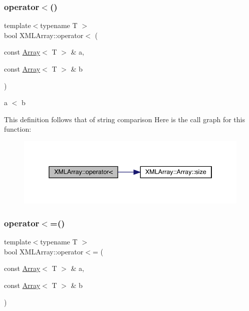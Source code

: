 \subsubsection{\texorpdfstring{operator$<$()}{operator<()}}
{\footnotesize\ttfamily template$<$typename T $>$ \\
bool X\+M\+L\+Array\+::operator$<$ (\begin{DoxyParamCaption}\item[{const \mbox{\hyperlink{classXMLArray_1_1Array}{Array}}$<$ T $>$ \&}]{a,  }\item[{const \mbox{\hyperlink{classXMLArray_1_1Array}{Array}}$<$ T $>$ \&}]{b }\end{DoxyParamCaption})\hspace{0.3cm}{\ttfamily [inline]}}



a $<$ b 

This definition follows that of string comparison Here is the call graph for this function\+:
\nopagebreak
\begin{figure}[H]
\begin{center}
\leavevmode
\includegraphics[width=338pt]{dd/db1/namespaceXMLArray_a6cdc9d50a3fbbd96cfbbef4bbaf78fa4_cgraph}
\end{center}
\end{figure}
\mbox{\label{namespaceXMLArray_a874058edffc8dde49083322f99229c95}} 
\subsubsection{\texorpdfstring{operator$<$=()}{operator<=()}}
{\footnotesize\ttfamily template$<$typename T $>$ \\
bool X\+M\+L\+Array\+::operator$<$= (\begin{DoxyParamCaption}\item[{const \mbox{\hyperlink{classXMLArray_1_1Array}{Array}}$<$ T $>$ \&}]{a,  }\item[{const \mbox{\hyperlink{classXMLArray_1_1Array}{Array}}$<$ T $>$ \&}]{b }\end{DoxyParamCaption})\hspace{0.3cm}{\ttfamily [inline]}}



